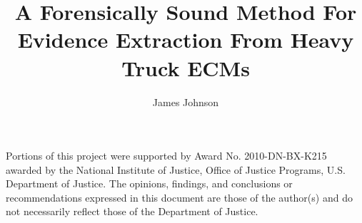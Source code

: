 \documentclass[12pt,letterpaper]{report}
\newif\iftestbox
\begin{document}
\iftestbox \testboxex \fi

%
%
\title{A Forensically Sound Method For Evidence Extraction From Heavy Truck ECMs}
\author{James Johnson}

%
%
\coadvisorfalse  %

%
%


\numofpages{\pageref{LastPage}}                    %

%
%
\thesisfalse  %

%
%

\copyrightfalse
\figurespagetrue   %
\tablespagetrue    %


\beforeabstract    %
\abstractp         %


%
%



\acknowledgementsp
%
%


Portions of this project were supported by Award No. 2010-DN-BX-K215 awarded by the National Institute of Justice, 
Office of Justice Programs, U.S. Department of Justice. The opinions, findings, and conclusions or recommendations 
expressed in this document are those of the author(s) and do not necessarily reflect those of the Department of Justice.
  
\end{document}
